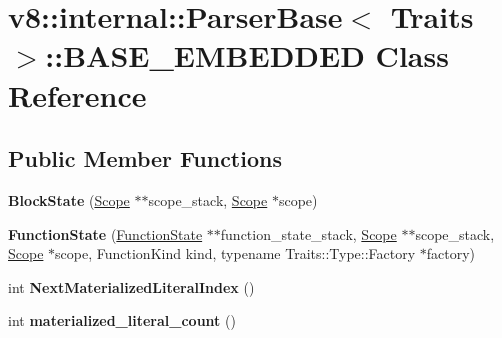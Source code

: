 \hypertarget{classv8_1_1internal_1_1_parser_base_1_1_b_a_s_e___e_m_b_e_d_d_e_d}{}\section{v8\+:\+:internal\+:\+:Parser\+Base$<$ Traits $>$\+:\+:B\+A\+S\+E\+\_\+\+E\+M\+B\+E\+D\+D\+ED Class Reference}
\label{classv8_1_1internal_1_1_parser_base_1_1_b_a_s_e___e_m_b_e_d_d_e_d}
\subsection*{Public Member Functions}
\begin{DoxyCompactItemize}
\item 
{\bfseries Block\+State} (\hyperlink{classv8_1_1internal_1_1_scope}{Scope} $\ast$$\ast$scope\+\_\+stack, \hyperlink{classv8_1_1internal_1_1_scope}{Scope} $\ast$scope)\hypertarget{classv8_1_1internal_1_1_parser_base_1_1_b_a_s_e___e_m_b_e_d_d_e_d_a68115b9f6b471b12840b0fa619291d60}{}\label{classv8_1_1internal_1_1_parser_base_1_1_b_a_s_e___e_m_b_e_d_d_e_d_a68115b9f6b471b12840b0fa619291d60}

\item 
{\bfseries Function\+State} (\hyperlink{classv8_1_1internal_1_1_function_state}{Function\+State} $\ast$$\ast$function\+\_\+state\+\_\+stack, \hyperlink{classv8_1_1internal_1_1_scope}{Scope} $\ast$$\ast$scope\+\_\+stack, \hyperlink{classv8_1_1internal_1_1_scope}{Scope} $\ast$scope, Function\+Kind kind, typename Traits\+::\+Type\+::\+Factory $\ast$factory)\hypertarget{classv8_1_1internal_1_1_parser_base_1_1_b_a_s_e___e_m_b_e_d_d_e_d_aa60006fe72a36f5fef92976c2697195d}{}\label{classv8_1_1internal_1_1_parser_base_1_1_b_a_s_e___e_m_b_e_d_d_e_d_aa60006fe72a36f5fef92976c2697195d}

\item 
int {\bfseries Next\+Materialized\+Literal\+Index} ()\hypertarget{classv8_1_1internal_1_1_parser_base_1_1_b_a_s_e___e_m_b_e_d_d_e_d_af00b51fa11ef142ca72114db8c07899b}{}\label{classv8_1_1internal_1_1_parser_base_1_1_b_a_s_e___e_m_b_e_d_d_e_d_af00b51fa11ef142ca72114db8c07899b}

\item 
int {\bfseries materialized\+\_\+literal\+\_\+count} ()\hypertarget{classv8_1_1internal_1_1_parser_base_1_1_b_a_s_e___e_m_b_e_d_d_e_d_a15cc1aa75cdcbb090f4c6f07241501a6}{}\label{classv8_1_1internal_1_1_parser_base_1_1_b_a_s_e___e_m_b_e_d_d_e_d_a15cc1aa75cdcbb090f4c6f07241501a6}


\end{DoxyCompactItemize}
